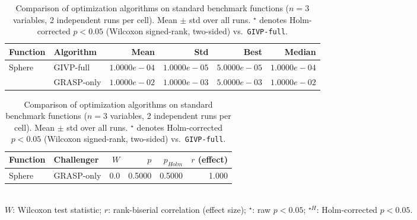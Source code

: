 
\begin{table}[htb]
\centering
\caption{Comparison of optimization algorithms on standard benchmark functions ($n=3$ variables, 2 independent runs per cell). Mean $\pm$ std over all runs. $^\star$ denotes Holm-corrected $p < 0.05$ (Wilcoxon signed-rank, two-sided) vs.\ \texttt{GIVP-full}.}
\label{tab:benchmark_comparison}
\begin{tabular}{llrrrr}
\toprule
Function & Algorithm & Mean & Std & Best & Median \\
\midrule
  \multirow{2}{*}{Sphere} & GIVP-full & $1.0000e-04$ & $1.0000e-05$ & $5.0000e-05$ & $1.0000e-04$ \\
   & GRASP-only & $1.0000e-02$ & $1.0000e-03$ & $5.0000e-03$ & $1.0000e-02$ \\
\bottomrule
\end{tabular}

\medskip
\begin{tabular}{llrrrr}
\toprule
Function & Challenger & $W$ & $p$ & $p_{Holm}$ & $r$ (effect) \\
\midrule
  Sphere & GRASP-only & 0.0 & 0.5000 & 0.5000 & 1.000 \\
\bottomrule
\end{tabular}
\\ \footnotesize{$W$: Wilcoxon test statistic; $r$: rank-biserial correlation (effect size); $^\star$: raw $p < 0.05$; $^{\star H}$: Holm-corrected $p < 0.05$.}
\end{table}